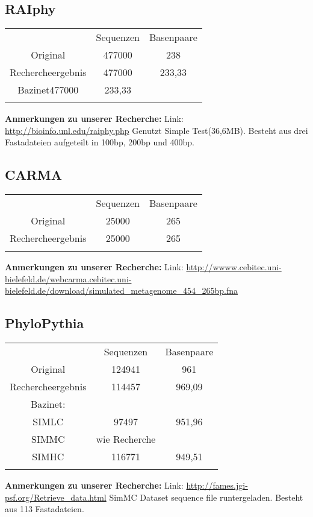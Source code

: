 \documentclass[a4paper, 11pt]{scrartcl}
\begin{document}
\begin{flushleft}
\subsection{RAIphy}
\begin{tabular}{ccc}
& Sequenzen & Basenpaare \\
Original&477000&238\\
Rechercheergebnis&477000&233,33\\
Bazinet477000&233,33\\
&&\\
\end{tabular}
\linebreak
\color{red}
\textbf{Anmerkungen zu unserer Recherche:}\linebreak
Link: \url{http://bioinfo.unl.edu/raiphy.php}
\linebreak
Genutzt Simple Test(36,6MB).
\linebreak
Besteht aus drei Fastadateien aufgeteilt in 100bp, 200bp und 400bp.
\color{black}
\newpage

\subsection{CARMA}
\begin{tabular}{ccc}
& Sequenzen & Basenpaare \\
Original&25000&265\\
Rechercheergebnis&25000&265\\
&&\\
\end{tabular}
\linebreak
\color{red}
\textbf{Anmerkungen zu unserer Recherche:}\linebreak
Link: \url{http://wwww.cebitec.uni-bielefeld.de/webcarma.cebitec.uni-bielefeld.de/download/simulated_metagenome_454_265bp.fna}
\color{black}

\subsection{PhyloPythia}
\begin{tabular}{ccc}
& Sequenzen & Basenpaare \\
Original&124941&961\\
Rechercheergebnis&114457&969,09\\
Bazinet:&\\
SIMLC& 97497&951,96\\
SIMMC& wie Recherche\\
SIMHC&116771&949,51\\
&&\\
\end{tabular}
\linebreak
\color{red}
\textbf{Anmerkungen zu unserer Recherche:}\linebreak
Link: \url{http://fames.jgi-psf.org/Retrieve_data.html}
\linebreak
SimMC Dataset sequence file runtergeladen.
\linebreak
Besteht aus 113 Fastadateien.
\color{black}


\end{flushleft}
\end{document}
